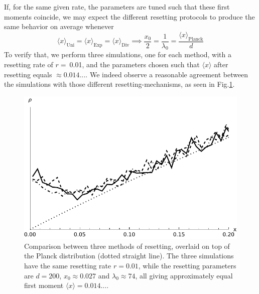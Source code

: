\documentclass[a4paper,12pt,reqno,superscriptaddress,nofootinbib]{revtex4}
\theoremstyle{plain}
\theoremstyle{definition}
\theoremstyle{remark}
\newcommand{\0}{^{(0)}}
\newcommand{\1}{^{(1)}}
\newcommand{\2}{^{(2)}}
\begin{document}
If, for the same given rate, the parameters are tuned such that these first moments coincide, we may expect the different resetting protocols to produce the same behavior on average whenever
\[\langle x \rangle_\text{Uni} = \langle x \rangle_\text{Exp}=\langle x\rangle_{\text{Div}} \implies \frac{x_0}{2}=\frac{1}{\lambda_0} = \frac{\langle x \rangle_\text{Planck}}{d}
\]
To verify that, we perform three simulations, one for each method, with a resetting rate of $r= \ $\num{0.01}, and the parameters chosen such that $\langle x \rangle$ after resetting equals $\approx 0.014...$. We indeed observe a reasonable agreement between the simulations with those different resetting-mechanisms, as seen in Fig.\ref{fig:compare}.\\

\begin{figure}[th]
	\includegraphics[width=\textwidth]{spd_compare.pdf}
	\caption{Comparison between three methods of resetting, overlaid on top of the Planck distribution (dotted straight line).  The three simulations have the same resetting rate  $r=0.01$, while the resetting parameters are $d=200$, $x_0\approx0.027$ and $\lambda_0\approx74$, all giving approximately equal first moment  $\langle x \rangle = 0.014...$. }\label{fig:compare}
\end{figure}
\end{document}
